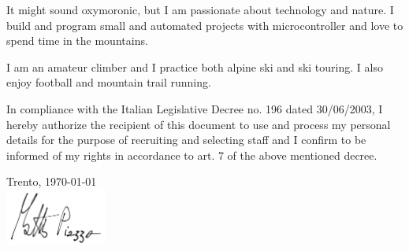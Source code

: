 \documentclass[9pt]{developercv_mattia} %
\begin{document}
\hfill
\begin{minipage}[t]{0.38\textwidth}
	\vspace{-\baselineskip} %
	It might sound oxymoronic, but I am passionate about technology and nature. 
	I build and program small and automated projects with microcontroller and love to spend time in the mountains.
%
\end{minipage}
\hfill
\begin{minipage}[t]{0.27\textwidth}
	\vspace{-\baselineskip} %
%
	I am an amateur climber and I practice both alpine ski and ski touring. I also enjoy football and mountain trail running. 
%
\end{minipage}

\vfill





In compliance with the Italian Legislative Decree no. 196 dated 30/06/2003, I hereby authorize the recipient of this document to use and process my personal details for the purpose of recruiting and selecting staff and I confirm to be informed of my rights in accordance to art. 7 of the above mentioned decree.

\vspace{0.5cm}
Trento, \today \\

\vspace{0.2cm}
\includegraphics[width=0.25\textwidth]{../shared/firma.jpg}
\end{document}
